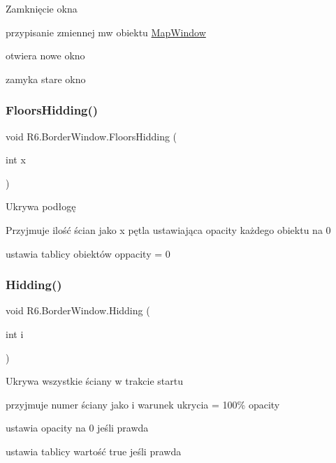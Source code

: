 Zamknięcie okna 

przypisanie zmiennej mw obiektu \mbox{\hyperlink{class_r6_1_1_map_window}{Map\+Window}} 

otwiera nowe okno 

zamyka stare okno \mbox{\label{class_r6_1_1_border_window_a359413bf0662feeeb3caa09a7226a139}} 
\subsubsection{\texorpdfstring{FloorsHidding()}{FloorsHidding()}}
{\footnotesize\ttfamily void R6.\+Border\+Window.\+Floors\+Hidding (\begin{DoxyParamCaption}\item[{int}]{x }\end{DoxyParamCaption})\hspace{0.3cm}{\ttfamily [private]}}



Ukrywa podłogę 

Przyjmuje ilość ścian jako x pętla ustawiająca opacity każdego obiektu na 0 

ustawia tablicy obiektów oppacity = 0 \mbox{\label{class_r6_1_1_border_window_a1591a1aa79f9d222f796e1016a5fa896}} 
\subsubsection{\texorpdfstring{Hidding()}{Hidding()}}
{\footnotesize\ttfamily void R6.\+Border\+Window.\+Hidding (\begin{DoxyParamCaption}\item[{int}]{i }\end{DoxyParamCaption})\hspace{0.3cm}{\ttfamily [private]}}



Ukrywa wszystkie ściany w trakcie startu 

przyjmuje numer ściany jako i warunek ukrycia = 100\% opacity 

ustawia opacity na 0 jeśli prawda 

ustawia tablicy wartość true jeśli prawda 

